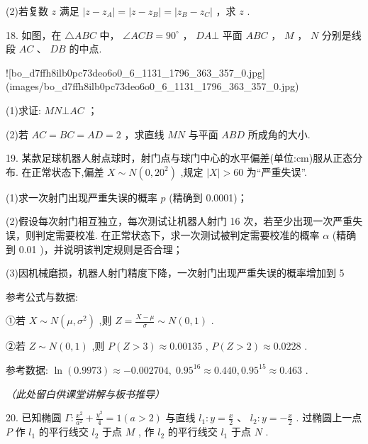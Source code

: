 \documentclass[10pt]{article}
\newcommand{\boardspace}[1]{%
  \par\vspace{#1}
}
\newcommand{\largeboardspace}{%
  \par\vspace{8cm}
  \hfill\textit{（此处留白供课堂讲解与板书推导）}
  \par\vspace{1cm}
}
\begin{document}
(2)若复数 \(z\) 满足 \(\left| {z - {z}_{A}}\right|  = \left| {z - {z}_{B}}\right|  = \left| {{z}_{B} - {z}_{C}}\right|\) ，求 \(z\) .

\boardspace{1.5cm}

\newpage

18. 如图，在 \(\bigtriangleup  {ABC}\) 中， \(\angle {ACB} = {90}^{ \circ  }\) ， \({DA}\bot\) 平面 \({ABC}\) ， \(M\) ， \(N\) 分别是线段 \({AC}\) 、 \({DB}\) 的中点.

![bo_d7ffh8ilb0pc73deo6o0_6_1131_1796_363_357_0.jpg](images/bo_d7ffh8ilb0pc73deo6o0_6_1131_1796_363_357_0.jpg)

(1)求证: \({MN}\bot {AC}\) ；

(2)若 \({AC} = {BC} = {AD} = 2\) ，求直线 \({MN}\) 与平面 \({ABD}\) 所成角的大小.

\boardspace{1.5cm}

19. 某款足球机器人射点球时，射门点与球门中心的水平偏差(单位:cm)服从正态分布. 在正常状态下,偏差 \(X \sim  N\left( {0,{20}^{2}}\right)\) ,规定 \(\left| X\right|  > {60}\) 为“严重失误”.

(1)求一次射门出现严重失误的概率 \(p\) (精确到 0.0001)；

(2)假设每次射门相互独立，每次测试让机器人射门 16 次，若至少出现一次严重失误，则判定需要校准. 在正常状态下，求一次测试被判定需要校准的概率 \(\alpha\) (精确到 0.01 )，并说明该判定规则是否合理；

(3)因机械磨损，机器人射门精度下降，一次射门出现严重失误的概率增加到 5%

参考公式与数据:

①若 \(X \sim  N\left( {\mu ,{\sigma }^{2}}\right)\) ,则 \(Z = \frac{X - \mu }{\sigma } \sim  N\left( {0,1}\right)\) .

②若 \(Z \sim  N\left( {0,1}\right)\) ,则 \(P\left( {Z > 3}\right)  \approx  {0.00135}\) , \(P\left( {Z > 2}\right)  \approx  {0.0228}\) .

参考数据: \(\ln \left( {0.9973}\right)  \approx   - {0.002704},\;{0.95}^{16} \approx  {0.440},{0.95}^{15} \approx  {0.463}\) .

\largeboardspace

\newpage

20. 已知椭圆 \(\Gamma  : \frac{{x}^{2}}{{a}^{2}} + \frac{{y}^{2}}{4} = 1\left( {a > 2}\right)\) 与直线 \({l}_{1} : y = \frac{x}{2}\text{ 、 }{l}_{2} : y =  - \frac{x}{2}\) . 过椭圆上一点 \(P\) 作 \({l}_{1}\) 的平行线交 \({l}_{2}\) 于点 \(M\) , 作 \({l}_{2}\) 的平行线交 \({l}_{1}\) 于点 \(N\) .
\end{document}
